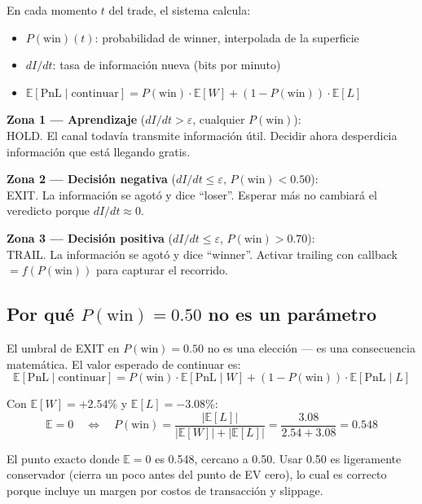 \documentclass[11pt,a4paper]{article}
\newcommand{\pw}{P(\text{win})}
\newcommand{\E}{\mathbb{E}}
\begin{document}
\begin{tcolorbox}[math, title=Criterio \'optimo de parada (Wald-Shannon)]
En cada momento $t$ del trade, el sistema calcula:
\begin{itemize}[leftmargin=1.5em]
\item $\pw(t)$: probabilidad de winner, interpolada de la superficie
\item $dI/dt$: tasa de informaci\'on nueva (bits por minuto)
\item $\E[\text{PnL} \mid \text{continuar}] = \pw \cdot \E[W] + (1-\pw) \cdot \E[L]$
\end{itemize}

\medskip
\textbf{Zona 1 --- Aprendizaje} ($dI/dt > \varepsilon$, cualquier $\pw$):\\
HOLD. El canal todav\'ia transmite informaci\'on \'util. Decidir ahora
desperdicia informaci\'on que est\'a llegando gratis.

\medskip
\textbf{Zona 2 --- Decisi\'on negativa} ($dI/dt \leq \varepsilon$, $\pw < 0.50$):\\
EXIT. La informaci\'on se agot\'o y dice ``loser''. Esperar m\'as no
cambiar\'a el veredicto porque $dI/dt \approx 0$.

\medskip
\textbf{Zona 3 --- Decisi\'on positiva} ($dI/dt \leq \varepsilon$, $\pw > 0.70$):\\
TRAIL. La informaci\'on se agot\'o y dice ``winner''. Activar trailing
con callback $= f(\pw)$ para capturar el recorrido.
\end{tcolorbox}

\subsection{Por qu\'e $\pw = 0.50$ no es un par\'ametro}

El umbral de EXIT en $\pw = 0.50$ no es una elecci\'on --- es una
consecuencia matem\'atica. El valor esperado de continuar es:
\begin{equation}
\E[\text{PnL} \mid \text{continuar}] = \pw \cdot \E[\text{PnL} \mid W] + (1-\pw) \cdot \E[\text{PnL} \mid L]
\end{equation}

Con $\E[W] = +2.54\%$ y $\E[L] = -3.08\%$:
\begin{equation}
\E = 0 \quad\Longleftrightarrow\quad \pw = \frac{|\E[L]|}{|\E[W]| + |\E[L]|} = \frac{3.08}{2.54 + 3.08} = 0.548
\end{equation}

El punto exacto donde $\E = 0$ es 0.548, cercano a 0.50. Usar 0.50
es ligeramente conservador (cierra un poco antes del punto de EV
cero), lo cual es correcto porque incluye un margen por costos de
transacci\'on y slippage.
\end{document}
